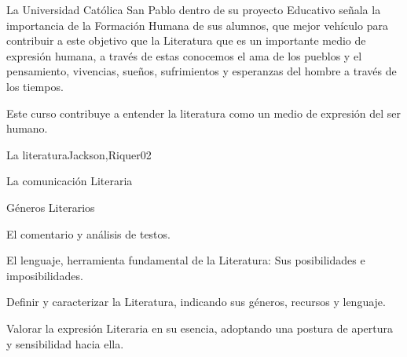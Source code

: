 \begin{syllabus}


\begin{justification}
La Universidad Católica San Pablo dentro de su proyecto Educativo señala la importancia de la Formación Humana de sus alumnos, que mejor vehículo para contribuir a este objetivo que la Literatura que es un importante medio de expresión humana, a través de estas  conocemos el ama de los pueblos y el pensamiento, vivencias, sueños, sufrimientos y esperanzas del hombre a través de los tiempos.
\end{justification}

\begin{goals}
\item Este curso contribuye a entender la literatura como un medio de expresión del ser humano.
\end{goals}

\begin{outcomes}
\end{outcomes}

\begin{unit}{La literatura}{Jackson,Riquer}{0}{2}
\begin{topics}
	\item La comunicación Literaria
	\item Géneros Literarios
	\item El comentario y análisis de testos.
	\item El lenguaje, herramienta fundamental de la Literatura: Sus posibilidades e imposibilidades.
\end{topics}
\begin{learningoutcomes}
	\item Definir y caracterizar la Literatura, indicando sus géneros, recursos y lenguaje.
	\item Valorar la expresión Literaria en su esencia, adoptando una postura de apertura y sensibilidad hacia ella.
\end{learningoutcomes}
\end{unit}


\end{syllabus}
